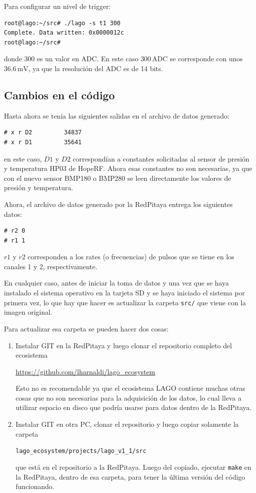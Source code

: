 \documentclass[a4paper,11pt]{article}
\begin{document}
\noindent Para configurar un nivel de trigger:
\begin{verbatim}
root@lago:~/src# ./lago -s t1 300
Complete. Data written: 0x0000012c
root@lago:~/src# 
\end{verbatim}

\noindent donde 300 es un valor en ADC. En este caso $300\,\text{ADC}$ se
corresponde con unos $36.6\,\text{mV}$, ya que la resolución del ADC es de 14
bits.

\subsection{Cambios en el código}
Hasta ahora se tenía las siguientes salidas en el archivo de datos generado:

\begin{verbatim}
# x r D2         34837
# x r D1         35641
\end{verbatim}

\noindent en este caso, $D1$ y $D2$ correspondían a constantes solicitadas al
sensor de presión y temperatura HP03 de HopeRF. Ahora esas constantes no son
necesarias, ya que con el nuevo sensor BMP180 o BMP280 se leen directamente los
valores de presión y temperatura.

Ahora, el archivo de datos generado por la RedPitaya entrega los siguientes
datos:

\begin{verbatim}
# r2 0
# r1 1
\end{verbatim}

\noindent $r1$ y $r2$ corresponden a los rates (o frecuencias) de pulsos que se
tiene en los canales 1 y 2, respectivamente.

En cualquier caso, antes de iniciar la toma de datos y una vez que se haya
instalado el sistema operativo en la tarjeta SD y se haya iniciado el sistema
por primera vez, lo que hay que hacer es actualizar la carpeta \texttt{src/} que
viene con la imagen original. 

Para actualizar esa carpeta se pueden hacer dos cosas:
\begin{enumerate}
				\item Instalar GIT en la RedPitaya y luego clonar el repositorio
								completo del ecosistema

								\href{https://github.com/lharnaldi/lago\_ecosystem}{https://github.com/lharnaldi/lago\_ecosystem} 

								Esto no es recomendable ya que el ecosistema LAGO contiene
								muchas otras cosas que no son necesarias para la adquisición de
								los datos, lo cual lleva a utilizar espacio en disco que podría
								usarse para datos dentro de la RedPitaya.
				\item Instalar GIT en otra PC, clonar el repositorio y luego copiar
								solamente la carpeta 

								\texttt{lago\_ecosystem/projects/lago\_v1\_1/src} 
								
								que está en el
								repositorio a la RedPitaya. Luego del copiado, ejecutar
								\texttt{make} en la RedPitaya, dentro de esa carpeta, para tener
								la última versión del código funcionando.
\end{enumerate}
\end{document}
